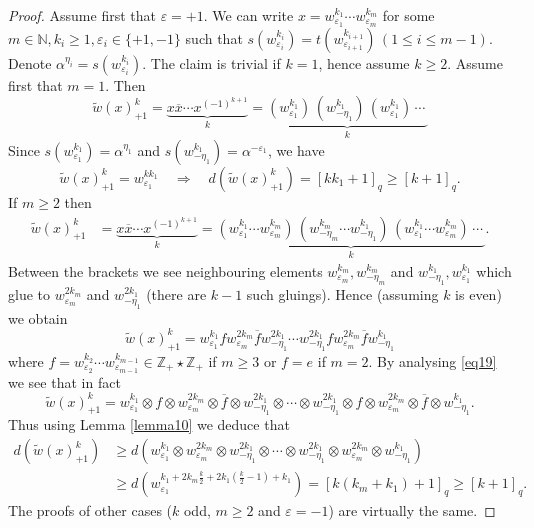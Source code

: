 \documentclass[11 pt, leqno]{amsart}
\newcommand{\eps}{\varepsilon}
\newcommand{\ov}{\overline}
\newcommand{\NN}{\mathbb{N}}
\newcommand{\ZZ}{\mathbb{Z}}
\theoremstyle{definition}
\numberwithin{equation}{section}
\begin{document}
\begin{proof}
Assume first that $\eps=+1$. %
We can write $x=w^{k_1}_{\eps_1}\cdots w^{k_m}_{\eps_m}$ for some $m\in\NN, k_i\ge 1,\eps_i\in \{+1,-1\}$ such that $s(w^{k_i}_{\eps_i})=t(w^{k_{i+1}}_{\eps_{i+1}})\,(1\le i \le m-1)$. Denote $\alpha^{\eta_i}=s(w^{k_i}_{\eps_i})$. The claim is trivial if $k=1$, hence assume $k\ge 2$. Assume first that $m=1$. Then
\[
\widetilde{w}(x)^k_{+1}=
\underbrace{x \ov{x}\cdots x^{(-1)^{k+1}}}_{k}=
\underbrace{(w^{k_1}_{\eps_1})\,
(w^{k_1}_{-\eta_1})\,
(w^{k_1}_{\eps_1})\,\cdots\,}_{k}
\]
Since $s(w^{k_1}_{\eps_1})=\alpha^{\eta_1}$ and $s(w^{k_1}_{-\eta_1})=\alpha^{-\eps_1}$, we have
\[
\widetilde{w}(x)^k_{+1}=
w_{\eps_1}^{k  k_1}\quad\Rightarrow\quad 
d(\widetilde{w}(x)^k_{+1})=
[k k_1+1]_q\ge [k+1]_q.
\]
 If $m\ge 2$ then
\[\begin{split}
\widetilde{w}(x)^k_{+1}&=
\underbrace{x \ov{x}\cdots x^{(-1)^{k+1}}}_{k}=
\underbrace{(w^{k_1}_{\eps_1}\cdots w^{k_m}_{\eps_{m}})\,
(w^{k_m}_{-\eta_m} \cdots w^{k_1}_{-\eta_1})\,(w^{k_1}_{\eps_1}\cdots w^{k_m}_{\eps_{m}})\,\cdots\,
}_{k}.
\end{split}\]
Between the brackets we see neighbouring elements $w^{k_m}_{\eps_m},w^{k_m}_{-\eta_m}$ and $w^{k_1}_{-\eta_1},w^{k_1}_{\eps_1}$ which glue to $w^{2 k_m}_{\eps_m}$ and $w^{2 k_1 }_{-\eta_1}$ (there are $k-1$ such gluings). Hence (assuming $k$ is even) we obtain
\[
\widetilde{w}(x)^k_{+1}=
w^{k_1}_{\eps_1}
f w^{2k_m}_{\eps_m} \ov{f}
w^{2 k_1 }_{-\eta_1} \cdots 
w^{2 k_1}_{-\eta_1} f
w^{2 k_m}_{\eps_m} \ov{f} w^{k_1}_{-\eta_1}
\]
where $f=w^{k_2}_{\eps_2} \cdots w^{k_{m-1}}_{\eps_{m-1}}\in \ZZ_+\star \ZZ_+$ if $m\ge 3$ or $f=e$ if $m=2$. By analysing \eqref{eq19} we see that in fact
\[
\widetilde{w}(x)^k_{+1}=
w^{k_1}_{\eps_1}\otimes
f \otimes w^{2k_m}_{\eps_m} \otimes \ov{f}
\otimes w^{2 k_1 }_{-\eta_1} \otimes\cdots \otimes
w^{2 k_1}_{-\eta_1}\otimes f\otimes
w^{2 k_m}_{\eps_m}\otimes \ov{f}\otimes w^{k_1}_{-\eta_1}.
\]
Thus using Lemma \ref{lemma10} we deduce that 
\[\begin{split}
d(\widetilde{w}(x)^k_{+1})&\ge 
d(
w^{k_1}_{\eps_1}\otimes
 w^{2k_m}_{\eps_m}\otimes
w^{2 k_1 }_{-\eta_1} \otimes\cdots \otimes
w^{2 k_1}_{-\eta_1}\otimes
w^{2 k_m}_{\eps_m} \otimes w^{k_1}_{-\eta_1})\\
&\ge 
d(w^{k_1 + 2k_m \frac{k}{2} + 2k_1 (\frac{k}{2}-1)+k_1}_{\eps_1})=
[k (k_m+k_1)+1]_q \ge 
[k+1]_q.
\end{split}\]
The proofs of other cases ($k$ odd, $m\ge 2$ and $\eps=-1$) are virtually the same.
\end{proof}
\end{document}
